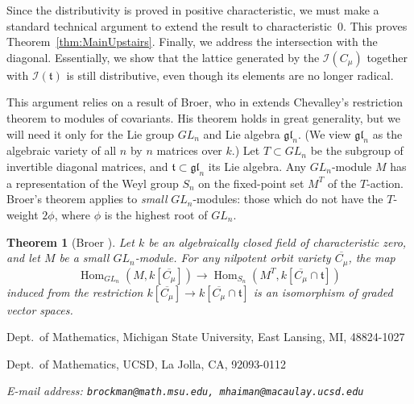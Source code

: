 \documentclass[12pt]{article}
\newcommand{\I}{{\mathcal{I}}}
\newcommand{\Sn}{S_{n}}
\newcommand{\GLn}{{GL}_{n}}
\newcommand{\gln}{{\mathfrak{gl}}_{n}}
\newcommand{\Cmu}{C_{\mu}}
\newcommand{\closure}[1]{\overline{#1}}
\newcommand{\Cbar}[1]{\closure{C_{#1}}}
\newcommand{\Cmubar}{\Cbar{\mu}}
\renewcommand{\t}{{\mathfrak{t}}}
\newcommand{\Hom}{\operatorname{Hom}}
\numberwithin{equation}{section}
\theoremstyle{plain}
\newtheorem{theorem}{Theorem}[section]
\theoremstyle{definition}
\theoremstyle{remark}
\begin{document}
Since the distributivity is proved in positive characteristic, we must
make a standard technical argument to extend the result to
characteristic~0.  This proves
Theorem~\ref{thm:MainUpstairs}.  Finally, we
address the intersection with the diagonal.  Essentially, we show that
the lattice generated by the $\I(\Cmu)$ together with $\I(\t)$ is
still distributive, even though its elements are no longer radical.

This argument relies on a result of Broer, who in
\cite{Broer} extends Chevalley's restriction theorem to modules of
covariants.  His theorem holds in great generality, but we will need
it only for the Lie group $\GLn$ and Lie algebra $\gln$.  (We view
$\gln$ as the algebraic variety of all $n$ by $n$ matrices over $k$.)
Let $T\subset\GLn$ be the subgroup of invertible diagonal matrices,
and $\t\subset\gln$ its Lie algebra.  Any $\GLn$-module $M$ has a
representation of the Weyl group $S_n$ on the fixed-point set $M^T$ of
the $T$-action.  Broer's theorem applies to {\em small}
$\GLn$-modules: those which do not have the $T$-weight $2\phi$, where
$\phi$ is the highest root of $\GLn$.
\begin{theorem}[Broer \cite{Broer}] \label{Broerthm}
Let $k$ be an algebraically closed field of characteristic zero, and
let $M$ be a small $\GLn$-module.  For any nilpotent orbit variety
$\Cmubar$, the map
\begin{equation}
\Hom_{\GLn}(M,k[\Cmubar])\to \Hom_{\Sn}(M^T,k[\Cmubar\cap\t])
\end{equation}
induced from the restriction $k[\Cmubar]\to k[\Cmubar\cap\t]$ is an
isomorphism of graded vector spaces.
\end{theorem}



{\sc Dept.\ of Mathematics, Michigan State University, East Lansing,
MI, 48824-1027}

{\sc Dept.\ of Mathematics, UCSD, La Jolla, CA, 92093-0112}

{\em E-mail address: {\tt brockman@math.msu.edu, mhaiman@macaulay.ucsd.edu}}
\end{document}
